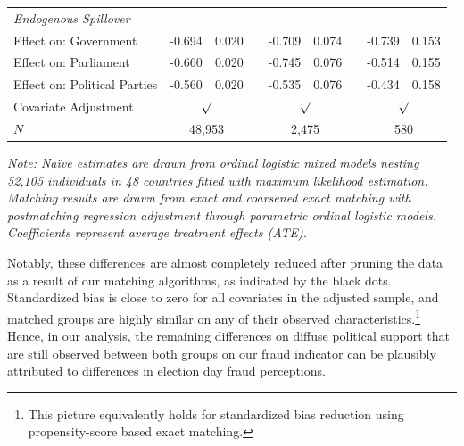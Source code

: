 \documentclass[11pt, ngerman,english,a4]{article}
\begin{document}
\begin{table}[]
\begin{tabular}{llllccccc}
\textit{Endogenous Spillover} &                                    &                                       &                               &                       &                      &                      &                      &                      \\
Effect on: Government         & -0.694                             & 0.020                                 &                               & -0.709                & 0.074                &                      & -0.739               & 0.153                \\
Effect on: Parliament         & -0.660                             & 0.020                                 &                               & -0.745                & 0.076                &                      & -0.514               & 0.155                \\
Effect on: Political Parties  & -0.560                             & 0.020                                 &                               & -0.535                & 0.076                &                      & -0.434               & 0.158                \\ \hline
Covariate Adjustment          & \multicolumn{2}{c}{$\surd$}                                                & \multicolumn{1}{c}{}          & \multicolumn{2}{c}{$\surd$}                  &                      & \multicolumn{2}{c}{$\surd$}                 \\
$N$                             & \multicolumn{2}{c}{48,953}                                                 & \multicolumn{1}{c}{}          & \multicolumn{2}{c}{2,475}                    &                      & \multicolumn{2}{c}{580}                     \\ \hline
\end{tabular}
\textit{Note: Na{\"i}ve estimates are drawn from ordinal logistic mixed models nesting 52,105 individuals in 48 countries fitted with maximum likelihood estimation. Matching results are drawn from exact and coarsened exact matching with postmatching regression adjustment through parametric ordinal logistic models. Coefficients represent average treatment effects (ATE).}
\end{table}

Notably, these differences are almost completely reduced after pruning the data as a result of our matching algorithms, as indicated by the black dots. Standardized bias is close to zero for all covariates in the adjusted sample, and matched groups are highly similar on any of their observed characteristics.\footnote{This picture equivalently holds for standardized bias reduction using propensity-score based exact matching.} Hence, in our analysis, the remaining differences on diffuse political support that are still observed between both groups on our fraud indicator can be plausibly attributed to differences in election day fraud perceptions. 
\end{document}
